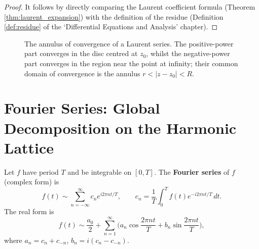 \begin{proof}
It follows by directly comparing the Laurent coefficient formula (Theorem \ref{thm:laurent_expansion}) with the definition of the residue (Definition \ref{def:residue} of the `Differential Equations and Analysis' chapter).
\end{proof}

\begin{figure}[htbp]
\centering
{}
\caption{The annulus of convergence of a Laurent series. The positive-power part converges in the disc centred at $z_0$, whilst the negative-power part converges in the region near the point at infinity; their common domain of convergence is the annulus $r < |z - z_0| < R$.}
\label{fig:laurent_annulus}
\end{figure}

\section{\texorpdfstring{Fourier Series: Global Decomposition on the Harmonic Lattice}{Fourier Series}}

\begin{definition}\label{def:fourier_series_foundations}
Let $f$ have period $T$ and be integrable on $[0,T]$. The \textbf{Fourier series} of $f$ (complex form) is
\[
f(t) \sim \sum_{n=-\infty}^{\infty} c_n e^{i 2\pi n t / T}, \qquad
c_n = \frac{1}{T}\int_0^T f(t) e^{-i 2\pi n t / T}\,dt.
\]
The real form is
\[
f(t) \sim \frac{a_0}{2} + \sum_{n=1}^{\infty} \Big( a_n \cos\frac{2\pi n t}{T} + b_n \sin\frac{2\pi n t}{T} \Big),
\]
where $a_n = c_n + c_{-n}$, $b_n = i(c_n - c_{-n})$.
\end{definition}

